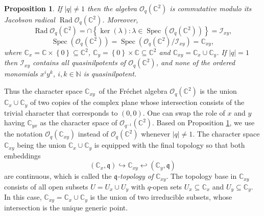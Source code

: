 \documentclass[12pt,reqno]{amsart}%
\theoremstyle{plain}
\newtheorem{proposition}{Proposition}
\numberwithin{theorem}{section} \numberwithin{equation}{section}
\numberwithin{lemma}{section}
\numberwithin{remark}{section}
\numberwithin{example}{section}
\numberwithin{proposition}{section}
\numberwithin{definition}{section}
\numberwithin{corollary}{section}
\begin{document}
\begin{proposition}
\label{tO}If $\left\vert q\right\vert \neq1$ then the algebra $\mathcal{O}%
_{q}\left(  \mathbb{C}^{2}\right)  $ is commutative modulo its Jacobson
radical $\operatorname{Rad}\mathcal{O}_{q}\left(  \mathbb{C}^{2}\right)  $.
Moreover,
\[
\operatorname{Rad}\mathcal{O}_{q}\left(  \mathbb{C}^{2}\right)  =\cap\left\{
\ker\left(  \lambda\right)  :\lambda\in\operatorname{Spec}\left(
\mathcal{O}_{q}\left(  \mathbb{C}^{2}\right)  \right)  \right\}
=\mathcal{I}_{xy},
\]%
\[
\operatorname{Spec}\left(  \mathcal{O}_{q}\left(  \mathbb{C}^{2}\right)
\right)  =\operatorname{Spec}\left(  \mathcal{O}_{q}\left(  \mathbb{C}%
^{2}\right)  /\mathcal{I}_{xy}\right)  =\mathbb{C}_{xy},
\]
where $\mathbb{C}_{x}=\mathbb{C\times}\left\{  0\right\}  \subseteq
\mathbb{C}^{2}$, $\mathbb{C}_{y}=\left\{  0\right\}  \times\mathbb{C\subseteq
C}^{2}$ and $\mathbb{C}_{xy}=\mathbb{C}_{x}\cup\mathbb{C}_{y}$. If $\left\vert
q\right\vert =1$ then $\mathcal{I}_{xy}$ contains all quasinilpotents of
$\mathcal{O}_{q}\left(  \mathbb{C}^{2}\right)  $, and none of the ordered
monomials $x^{i}y^{k}$, $i,k\in\mathbb{N}$ is quasinilpotent.
\end{proposition}

Thus the character space $\mathbb{C}_{xy}$\ of the Fr\'{e}chet algebra
$\mathcal{O}_{q}\left(  \mathbb{C}^{2}\right)  $ is the union $\mathbb{C}%
_{x}\cup\mathbb{C}_{y}$ of two copies of the complex plane whose intersection
consists of the trivial character that corresponds to $\left(  0,0\right)  $.
One can swap the role of $x$ and $y$ having $\mathbb{C}_{yx}$ as the character
space of $\mathcal{O}_{q^{-1}}\left(  \mathbb{C}^{2}\right)  $. Based on
Proposition \ref{tO}, we use the notation $\mathcal{O}_{q}\left(
\mathbb{C}_{xy}\right)  $ instead of $\mathcal{O}_{q}\left(  \mathbb{C}%
^{2}\right)  $ whenever $\left\vert q\right\vert \neq1$. The character space
$\mathbb{C}_{xy}$ being the union $\mathbb{C}_{x}\cup\mathbb{C}_{y}$ is
equipped with the final topology so that both embeddings
\[
\left(  \mathbb{C}_{x},\mathfrak{q}\right)  \hookrightarrow\mathbb{C}%
_{xy}\hookleftarrow\left(  \mathbb{C}_{y},\mathfrak{q}\right)
\]
are continuous, which is called the $\mathfrak{q}$\textit{-topology of}
$\mathbb{C}_{xy}$. The topology base in $\mathbb{C}_{xy}$ consists of all open
subsets $U=U_{x}\cup U_{y}$ with $q$-open sets $U_{x}\subseteq\mathbb{C}_{x}$
and $U_{y}\subseteq\mathbb{C}_{y}$. In this case, $\mathbb{C}_{xy}%
=\mathbb{C}_{x}\cup\mathbb{C}_{y}$ is the union of two irreducible subsets,
whose intersection is the unique generic point.
\end{document}
